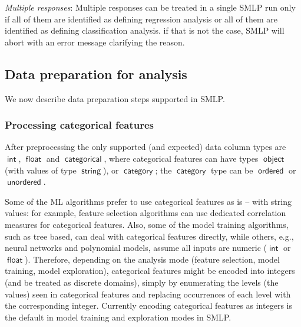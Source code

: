 \documentclass[a4paper,parskip=half]{article} %
\newcommand*\dtype[1]{\operatorname{\mathsf{#1}}} %
\newcommand{\delete}[1]{}
\begin{document}
\noindent \emph{Multiple responses}: 
Multiple responses can be treated in a single SMLP run only if all of them are identified as 
defining regression analysis or all of them are identified as defining classification analysis.
if that is not the case, SMLP will abort with an error message clarifying the reason.
        

\delete{
\subsection{Optimization problems}

If we are dealing with an optimization problem for a response or multiple responses, then combination
$positive\_value = STAT\_POSITIVE\_VALUE$ and $negative\_value = STAT\_NEGATIVE\_VALUE$ specifies that 
we want to maximize the response values (find regions in input space where the responses are
close to maximum / close to Pareto optimal with respect to maximization; and conversely, combination
$positive\_value = STAT\_NEGATIVE\_VALUE$ and $negative\_value = STAT\_POSITIVE\_VALUE$ 
specifies that we are looking at (Pareto) optimization problem with respect to minimization.
}




\subsection{Data preparation for analysis}\label{sec:data}

We now describe data preparation steps supported in SMLP. 


\subsubsection{Processing categorical features}

After preprocessing the only supported (and expected) data column types are $\dtype{int}$,  
$\dtype{float}$ and $\dtype{categorical}$, where categorical features can have types  $\dtype{object}$
(with values of type $\dtype{string}$), or $\dtype{category}$; the  $\dtype{category}$ type can be 
 $\dtype{ordered}$ or  $\dtype{unordered}$.

Some of the ML algorithms prefer to use categorical features as is -- with string values: for example,
feature selection algorithms can use dedicated correlation measures for categorical features. Also,
some of the model training algorithms, such as tree based, can deal with categorical features directly, 
while others, e.g., neural networks and polynomial models, assume all inputs are numeric
($\dtype{int}$ or $\dtype{float}$). Therefore, depending on the analysis mode (feature selection, model training,
model exploration), categorical features might be encoded into integers (and be treated as discrete 
domains), simply by enumerating the levels (the values) seen in categorical
features and replacing occurrences of each level with the corresponding integer. Currently 
encoding categorical features as integers is the default in model training and exploration modes in SMLP.
\end{document}
